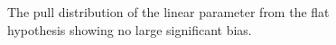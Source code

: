 \begin{figure}[h!]
  \centering
  ~~
  \\
  ~~
  \\
  \caption{\label{fig:pulls} 
  The pull distribution of the linear parameter from the flat hypothesis showing no large significant bias.}
\end{figure}
